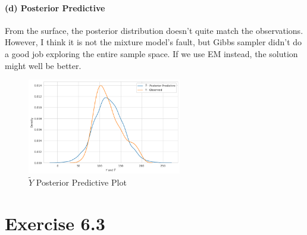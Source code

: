 \documentclass[11pt, letterpaper]{article}
\begin{document}
\paragraph{(d) Posterior Predictive}
From the surface, the posterior distribution doesn't quite match the observations. However, I think it is not the mixture model's fault, but Gibbs sampler didn't do a good job exploring the entire sample space. If we use EM instead, the solution might well be better. 
\begin{figure}[!h]
  \centering
  \includegraphics[width=0.6\textwidth]{6.2.3.png}
  \captionsetup{justification=centering}
  \caption{$\tilde{Y}$ Posterior Predictive Plot}
\end{figure}

\newpage

\section{Exercise 6.3}
\end{document}
